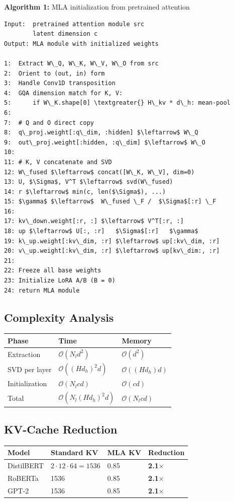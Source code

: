 \textbf{Algorithm 1:} MLA initialization from pretrained attention
\begin{lstlisting}
Input:  pretrained attention module src
        latent dimension c
Output: MLA module with initialized weights

1:  Extract W\_Q, W\_K, W\_V, W\_O from src
2:  Orient to (out, in) form
3:  Handle Conv1D transposition
4:  GQA dimension match for K, V:
5:      if W\_K.shape[0] \textgreater{} H\_kv * d\_h: mean-pool
6:
7:  # Q and O direct copy
8:  q\_proj.weight[:q\_dim, :hidden] $\leftarrow$ W\_Q
9:  out\_proj.weight[:hidden, :q\_dim] $\leftarrow$ W\_O
10:
11: # K, V concatenate and SVD
12: W\_fused $\leftarrow$ concat([W\_K, W\_V], dim=0)
13: U, $\Sigma$, V^T $\leftarrow$ svd(W\_fused)
14: r $\leftarrow$ min(c, len($\Sigma$), ...)
15: $\gamma$ $\leftarrow$  W\_fused \_F /  $\Sigma$[:r] \_F
16:
17: kv\_down.weight[:r, :] $\leftarrow$ V^T[:r, :]
18: up $\leftarrow$ U[:, :r]   $\Sigma$[:r]   $\gamma$
19: k\_up.weight[:kv\_dim, :r] $\leftarrow$ up[:kv\_dim, :r]
20: v\_up.weight[:kv\_dim, :r] $\leftarrow$ up[kv\_dim:, :r]
21:
22: Freeze all base weights
23: Initialize LoRA A/B (B = 0)
24: return MLA module
\end{lstlisting}

\subsection{Complexity Analysis}

\begin{table}[H]
\centering
\small
\begin{tabular}{lll}
\toprule
\textbf{Phase} & \textbf{Time} & \textbf{Memory} \\
\midrule
Extraction & $\mathcal{O}(N_l d^2)$ & $\mathcal{O}(d^2)$ \\
SVD per layer & $\mathcal{O}((H d_h)^2 d)$ & $\mathcal{O}((H d_h) d)$ \\
Initialization & $\mathcal{O}(N_l c d)$ & $\mathcal{O}(c d)$ \\
Total & $\mathcal{O}(N_l (H d_h)^2 d)$ & $\mathcal{O}(N_l c d)$ \\
\bottomrule
\end{tabular}
\end{table}

\subsection{KV-Cache Reduction}

\begin{table}[H]
\centering
\small
\begin{tabular}{llll}
\toprule
\textbf{Model} & \textbf{Standard KV} & \textbf{MLA KV} & \textbf{Reduction} \\
\midrule
DistilBERT & $2 \cdot 12 \cdot 64 = 1536$ & 0.85 & \textbf{2.1$\times$} \\
RoBERTa & 1536 & 0.85 & \textbf{2.1$\times$} \\
GPT-2 & 1536 & 0.85 & \textbf{2.1$\times$} \\
\bottomrule
\end{tabular}
\end{table}

